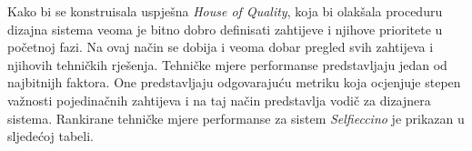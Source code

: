 \documentclass[12pt]{article}
\begin{document}
Kako bi se konstruisala uspje\v{s}na \textit{House of Quality}, koja bi olak\v{s}ala proceduru dizajna sistema veoma je bitno dobro definisati zahtijeve i njihove prioritete u po\v{c}etnoj fazi. Na ovaj na\v{c}in se dobija i veoma dobar pregled svih zahtijeva i njihovih tehni\v{c}kih rje\v{s}enja. Tehni\v{c}ke mjere performanse predstavljaju jedan od najbitnijh faktora. One predstavljaju odgovaraju\'cu metriku koja ocjenjuje stepen va\v{z}nosti pojedina\v{c}nih zahtijeva i na taj na\v{c}in predstavlja vodi\v{c} za dizajnera sistema. Rankirane tehni\v{c}ke mjere performanse za sistem \textit{Selfieccino} je prikazan u sljede\'coj tabeli.

 
 
 
 
\newpage
\renewcommand{\refname}{Izvori}

\nocite{*}

\end{document}
